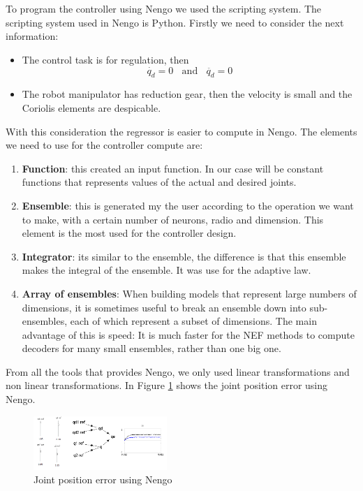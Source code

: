 To program the controller using Nengo we used the scripting system. The scripting system used in Nengo is Python. Firstly we need to consider the next information:

\begin{itemize}
\item The control task is for regulation, then
$$\dot{q_d}=0 \ \ \ \ \mbox{and} \ \ \ \ \ddot{q_d}=0$$
\item The robot manipulator has reduction gear, then the velocity is small and the Coriolis elements are despicable.
\end{itemize}

With this consideration the regressor is easier to compute in Nengo. The elements we need to use for the controller compute are:

\begin{enumerate}
\item \textbf{Function}: this created an input function. In our case will be constant functions that represents values of the actual and desired joints.
\item \textbf{Ensemble}: this is generated my the user according to the operation we want to make, with a certain number of neurons, radio and dimension. This element is the most used for the controller design.
\item \textbf{Integrator}: its similar to the ensemble, the difference is that this ensemble makes the integral of the ensemble. It was use for the adaptive law.
\item \textbf{Array of ensembles}: When building models that represent large numbers of dimensions, it is sometimes useful to break an ensemble down
into sub-ensembles, each of which represent a subset of dimensions. The main advantage of this is speed: It is much faster for the NEF methods to compute decoders for many small
ensembles, rather than one big one.
\end{enumerate}

From all the tools that provides Nengo, we only used linear transformations and non linear transformations. In Figure \ref{fig:error} shows the joint position error using Nengo.\\

\begin{figure}[h]
\centering
\includegraphics[width=0.45\textwidth]{imagenes/6-neuronal/error.png}
 \caption{Joint position error using Nengo}
 \label{fig:error}
\end{figure}

